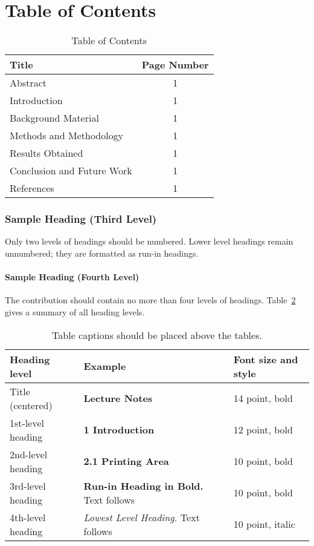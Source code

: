 \documentclass[runningheads]{llncs}
\begin{document}
\section{Table of Contents}

\begin{table}
\centering
\caption{Table of Contents}\label{tab1}
\begin{tabular}{|l|c|}
\hline
Title &  Page Number\\
\hline
Abstract & 1\\
Introduction &  1\\
Background Material & 1\\
Methods and Methodology & 1\\
Results Obtained & 1\\
Conclusion and Future Work & 1\\
References & 1\\
\hline
\end{tabular}
\end{table}

\subsubsection{Sample Heading (Third Level)} Only two levels of
headings should be numbered. Lower level headings remain unnumbered;
they are formatted as run-in headings.

\paragraph{Sample Heading (Fourth Level)}
The contribution should contain no more than four levels of
headings. Table~\ref{tab1} gives a summary of all heading levels.

\begin{table}
\caption{Table captions should be placed above the
tables.}\label{tab1}
\begin{tabular}{|l|l|l|}
\hline
Heading level &  Example & Font size and style\\
\hline
Title (centered) &  {\Large\bfseries Lecture Notes} & 14 point, bold\\
1st-level heading &  {\large\bfseries 1 Introduction} & 12 point, bold\\
2nd-level heading & {\bfseries 2.1 Printing Area} & 10 point, bold\\
3rd-level heading & {\bfseries Run-in Heading in Bold.} Text follows & 10 point, bold\\
4th-level heading & {\itshape Lowest Level Heading.} Text follows & 10 point, italic\\
\hline
\end{tabular}
\end{table}
\end{document}
